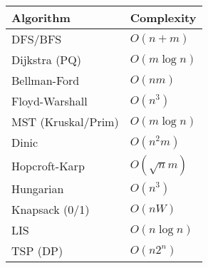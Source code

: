 \begin{tabular}{|l|l|}
\hline
Algorithm & Complexity \\[1mm]
\hline
DFS/BFS & $O(n+m)$ \\[1mm]
Dijkstra (PQ) & $O(m\log n)$ \\[1mm]
Bellman-Ford & $O(nm)$ \\[1mm]
Floyd-Warshall & $O(n^3)$ \\[1mm]
MST (Kruskal/Prim) & $O(m\log n)$ \\[1mm]
Dinic & $O(n^2 m)$ \\[1mm]
Hopcroft-Karp & $O(\sqrt{n}m)$ \\[1mm]
Hungarian & $O(n^3)$ \\[1mm]
Knapsack (0/1) & $O(nW)$ \\[1mm]
LIS & $O(n\log n)$ \\[1mm]
TSP (DP) & $O(n2^n)$ \\[1mm]
\hline
\end{tabular}